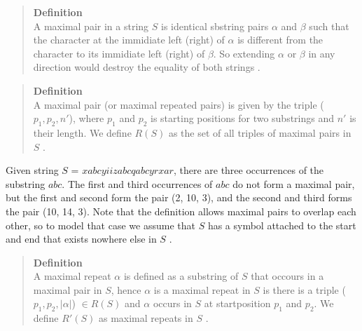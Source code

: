 \documentclass[12pt]{article} %
\begin{document}
\begin{quote}
\textbf{Definition} \\
A maximal pair in a string $S$ is identical sbstring pairs $\alpha$ and $\beta$ such that the character at the immidiate left (right) of $\alpha$ is different from the character to its immidiate left (right) of $\beta$. So extending $\alpha$ or $\beta$ in any direction would destroy the equality of both strings \cite{gusfield}. 
\end{quote}

\begin{quote}
\textbf{Definition} \\
A maximal pair (or maximal repeated pairs) is given by the triple ($p_1, p_2, n'$), where $p_1$ and $p_2$ is starting positions for two substrings and $n'$ is their length. We define $R(S)$ as the set of all triples of maximal pairs in $S$ \cite{gusfield}.
\end{quote}

Given string $S$ = $xabcyiizabcqabcyrxar$, there are three occurrences of the substring $abc$. The first and third occurrences of $abc$ do not form a maximal pair, but the first and second form the pair (2, 10, 3), and the second and third forms the pair (10, 14, 3). Note that the definition allows maximal pairs to overlap each other, so to model that case we assume that $S$ has a symbol attached to the start and end that exists nowhere else in $S$ \cite{gusfield}.


\begin{quote}
\textbf{Definition} \\
A maximal repeat $\alpha$ is defined as a substring of $S$ that occours in a maximal pair in $S$, hence $\alpha$ is a maximal repeat in $S$ is there is a triple ($p_1, p_2, |\alpha|$) $ \in R(S)$  and $\alpha$ occurs in $S$ at startposition $p_1$ and $p_2$. We define $R'(S)$ as maximal repeats in $S$ \cite{gusfield}.
\end{quote}
\end{document}
